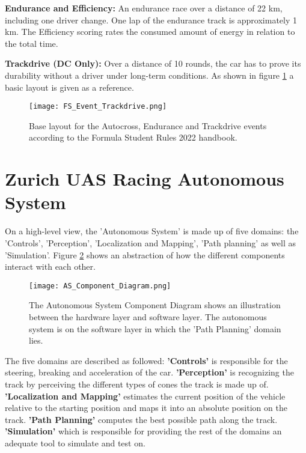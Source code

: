 \textbf{Endurance and Efficiency:} An endurance race over a distance of 22 km, including one driver change. One lap of the endurance track is approximately 1 km. The Efficiency scoring rates the consumed amount of energy in relation to the total time.

\textbf{Trackdrive (DC Only):}  Over a distance of 10 rounds, the car has to prove its durability without a driver under long-term conditions. As shown in figure \ref{fig:FS Autocross, Endurance and Trackdrive layout} a basic layout is given as a reference.
\begin{figure}[H]
    \centering
    \texttt{[image: FS\_Event\_Trackdrive.png]}
    \caption{Base layout for the Autocross, Endurance and Trackdrive events according to the Formula Student Rules 2022 handbook. \cite{fs_rules_2022_handbook}}
    \label{fig:FS Autocross, Endurance and Trackdrive layout}
\end{figure}

\section{Zurich UAS Racing Autonomous System} \label{sec:Zurich UAS Racing Autonomous System}
On a high-level view, the 'Autonomous System' is made up of five domains: the 'Controls', 'Perception', 'Localization and Mapping', 'Path planning' as well as 'Simulation'. Figure \ref{fig:AS Component Diagram} shows an abstraction of how the different components interact with each other.
\begin{figure}[H]
    \centering
    \texttt{[image: AS\_Component\_Diagram.png]}
    \caption{The Autonomous System Component Diagram shows an illustration between the hardware layer and software layer. The autonomous system is on the software layer in which the 'Path Planning' domain lies.}
    \label{fig:AS Component Diagram}
\end{figure}
The five domains are described as followed:
\textbf{'Controls'} is responsible for the steering, breaking and acceleration of the car.
\textbf{'Perception'} is recognizing the track by perceiving the different types of cones the track is made up of.
\textbf{'Localization and Mapping'} estimates the current position of the vehicle relative to the starting position and maps it into an absolute position on the track.
\textbf{'Path Planning'} computes the best possible path along the track.
\textbf{'Simulation'} which is responsible for providing the rest of the domains an adequate tool to simulate and test on.


